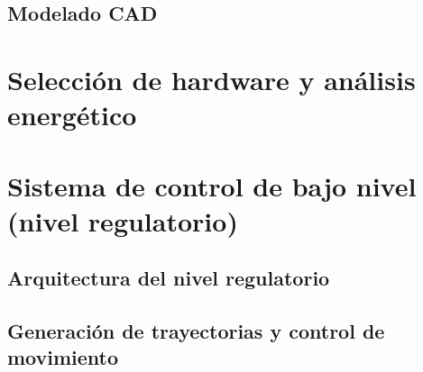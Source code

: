 \documentclass[a4paper,12pt]{report}
\begin{document}
\subsection{Modelado CAD}
%

%

\section{Selección de hardware y análisis energético}









\section{Sistema de control de bajo nivel (nivel regulatorio)}

\subsection{Arquitectura del nivel regulatorio}


% 
% 
% 

% 
% 

\subsection{Generación de trayectorias y control de movimiento}



\end{document}
